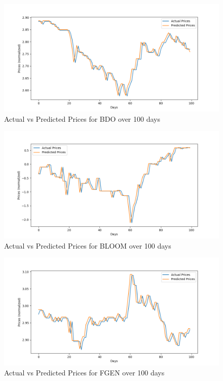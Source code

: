\begin{figure}[ht]
    \centering
    \includegraphics[width=1\textwidth]{./assets/Chapter_4/DMD_LSTM_crossval/100days/BDO.png}
    \caption{Actual vs Predicted Prices for BDO over 100 days}
    \label{fig:crossval100_BDO}
\end{figure}
\FloatBarrier

\begin{figure}[ht]
    \centering
    \includegraphics[width=1\textwidth]{./assets/Chapter_4/DMD_LSTM_crossval/100days/BLOOM.png}
    \caption{Actual vs Predicted Prices for BLOOM over 100 days}
    \label{fig:crossval100_BLOOM}
\end{figure}
\FloatBarrier

\begin{figure}[ht]
    \centering
    \includegraphics[width=1\textwidth]{./assets/Chapter_4/DMD_LSTM_crossval/100days/FGEN.png}
    \caption{Actual vs Predicted Prices for FGEN over 100 days}
    \label{fig:crossval100_FGEN}
\end{figure}
\FloatBarrier

